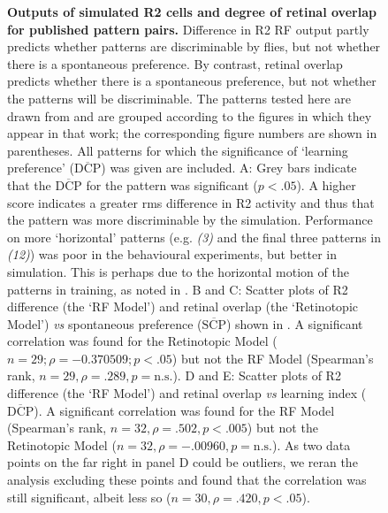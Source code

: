 \documentclass[10pt]{article}
\begin{document}
\begin{figure}[htp]
	\caption{
		{\bf Outputs of simulated R2 cells and degree of retinal overlap for published pattern pairs.}
		Difference in R2 RF output partly predicts whether patterns are discriminable by flies, but not whether there is a spontaneous preference.
		By contrast, retinal overlap predicts whether there is a spontaneous preference, but not whether the patterns will be discriminable.
		The patterns tested here are drawn from \protect\cite{Ernst1999} and are grouped according to the figures in which they appear in that work; the corresponding figure numbers are shown in parentheses.
		All patterns for which the significance of `learning preference' ($\overline{\mathrm{DCP}}$) was given are included.
		A: Grey bars indicate that the $\overline{\mathrm{DCP}}$ for the pattern was significant ($p<.05$).
		A higher score indicates a greater \ac{rms} difference in R2 activity and thus that the pattern was more discriminable by the simulation.
		Performance on more `horizontal' patterns (e.g. \emph{(3)} and the final three patterns in \emph{(12)}) was poor in the behavioural experiments, but better in simulation.
		This is perhaps due to the horizontal motion of the patterns in training, as noted in \protect\cite{Ernst1999}.
		B and C: Scatter plots of R2 difference (the `RF Model') and retinal overlap (the `Retinotopic Model') \emph{vs} spontaneous preference ($\overline{\mathrm{SCP}}$) shown in \protect\cite{Ernst1999}.
		A significant correlation was found for the Retinotopic Model ($n = 29; \rho = -0.370509; p < .05$) but not the RF Model (Spearman's rank, $n=29, \rho=.289, p=\mathrm{n.s.}$).
		D and E: Scatter plots of R2 difference (the `RF Model') and retinal overlap \emph{vs} learning index ($\overline{\mathrm{DCP}}$).
		A significant correlation was found for the RF Model (Spearman's rank, $n=32, \rho=.502, p < .005$) but not the Retinotopic Model ($n=32, \rho=-.00960, p=\mathrm{n.s.}$).
		As two data points on the far right in panel D could be outliers, we reran the analysis excluding these points and found that the correlation was still significant, albeit less so ($n=30, \rho=.420, p < .05$).
		}
	\label{fig:pattern}
\end{figure}
\end{document}
